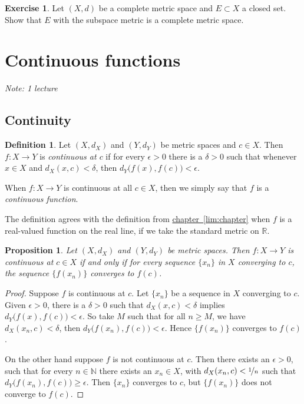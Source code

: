 \documentclass[12pt]{book}
\newcommand{\R}{{\mathbb{R}}}
\newcommand{\N}{{\mathbb{N}}}
\newcommand{\myindex}[1]{#1\index{#1}}
\newcommand{\sectionnotes}[1]{\noindent \emph{Note: #1} \medskip \par}
\newcommand{\sectionnewpage}{\clearpage}
\theoremstyle{plain}
\newtheorem{prop}[thm]{Proposition}
\theoremstyle{remark}
\theoremstyle{definition}
\newtheorem{defn}[thm]{Definition}
\theoremstyle{exercise}
\newtheorem{exercise}{Exercise}[section]
\theoremstyle{example}
\newcommand{\chapterref}[1]{\hyperref[#1]{chapter~\ref*{#1}}}
\begin{document}
\begin{exercise} \label{exercise:closedcomplete}
Let $(X,d)$ be a complete metric space and $E \subset X$ a closed set.
Show that $E$ with the subspace metric is a complete metric space.
\end{exercise}


\sectionnewpage
\section{Continuous functions}
\label{sec:metcont}

\sectionnotes{1 lecture}

\subsection{Continuity}

\begin{defn}
Let $(X,d_X)$ and $(Y,d_Y)$ be metric spaces and $c \in X$.
Then $f \colon X \to Y$ is
\emph{continuous at $c$}
if for every $\epsilon > 0$
there is a $\delta > 0$ such that whenever $x \in X$ and $d_X(x,c) <
\delta$, then
$d_Y\bigl(f(x),f(c)\bigr) < \epsilon$.

\medskip

When $f \colon X \to Y$ is continuous at all $c \in X$, then we simply say
that $f$ is a \emph{\myindex{continuous function}}.
\end{defn}

The definition agrees with the definition from \chapterref{lim:chapter} when
$f$ is a real-valued function on the real line, if we take the standard
metric on $\R$.

\begin{prop} \label{prop:contiscont}
Let $(X,d_X)$ and $(Y,d_Y)$ be metric spaces.
Then $f \colon X \to Y$ is
continuous at $c \in X$
if and only if for every sequence $\{ x_n \}$ in $X$
converging to $c$, the sequence $\{ f(x_n) \}$ converges
to $f(c)$.
\end{prop}

\begin{proof}
Suppose $f$ is continuous at $c$.  Let $\{ x_n \}$ be a
sequence in $X$ converging to $c$.  Given $\epsilon > 0$,
there is a $\delta > 0$ such that $d_X(x,c) < \delta$ implies
$d_Y\bigl(f(x),f(c)\bigr) < \epsilon$.  So take $M$ such that
for all $n \geq M$, we have $d_X(x_n,c) < \delta$, then
$d_Y\bigl(f(x_n),f(c)\bigr) < \epsilon$.  Hence $\{ f(x_n) \}$
converges to $f(c)$.

On the other hand suppose $f$ is not continuous at $c$.
Then there exists an $\epsilon > 0$,
such that for every $n \in \N$ there exists an $x_n \in X$,
with
$d_X(x_n,c) < \nicefrac{1}{n}$ such that $d_Y\bigl(f(x_n),f(c)\bigr) \geq
\epsilon$.  Then $\{ x_n \}$ converges to $c$, but $\{ f(x_n) \}$
does not converge to $f(c)$.
\end{proof}
\end{document}

